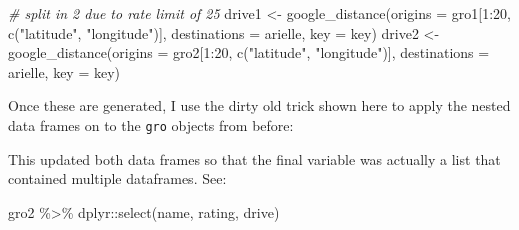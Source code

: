 \documentclass[]{tufte-handout}
\newenvironment{Shaded}{}{}
\newcommand{\AttributeTok}[1]{\textcolor[rgb]{0.49,0.56,0.16}{#1}}
\newcommand{\CommentTok}[1]{\textcolor[rgb]{0.38,0.63,0.69}{\textit{#1}}}
\newcommand{\DecValTok}[1]{\textcolor[rgb]{0.25,0.63,0.44}{#1}}
\newcommand{\FunctionTok}[1]{\textcolor[rgb]{0.02,0.16,0.49}{#1}}
\newcommand{\NormalTok}[1]{#1}
\newcommand{\OtherTok}[1]{\textcolor[rgb]{0.00,0.44,0.13}{#1}}
\newcommand{\SpecialCharTok}[1]{\textcolor[rgb]{0.25,0.44,0.63}{#1}}
\newcommand{\StringTok}[1]{\textcolor[rgb]{0.25,0.44,0.63}{#1}}
\begin{document}
\begin{Shaded}
\begin{Highlighting}[]
\CommentTok{\# split in 2 due to rate limit of 25}
\NormalTok{drive1 }\OtherTok{\textless{}{-}} \FunctionTok{google\_distance}\NormalTok{(}\AttributeTok{origins =}\NormalTok{ gro1[}\DecValTok{1}\SpecialCharTok{:}\DecValTok{20}\NormalTok{, }\FunctionTok{c}\NormalTok{(}\StringTok{"latitude"}\NormalTok{, }\StringTok{"longitude"}\NormalTok{)],}
                      \AttributeTok{destinations =}\NormalTok{ arielle,}
                      \AttributeTok{key =}\NormalTok{ key)}
\NormalTok{drive2 }\OtherTok{\textless{}{-}} \FunctionTok{google\_distance}\NormalTok{(}\AttributeTok{origins =}\NormalTok{ gro2[}\DecValTok{1}\SpecialCharTok{:}\DecValTok{20}\NormalTok{, }\FunctionTok{c}\NormalTok{(}\StringTok{"latitude"}\NormalTok{, }\StringTok{"longitude"}\NormalTok{)],}
                          \AttributeTok{destinations =}\NormalTok{ arielle,}
                          \AttributeTok{key =}\NormalTok{ key)}
\end{Highlighting}
\end{Shaded}

Once these are generated, I use the dirty old trick shown here to apply
the nested data frames on to the \texttt{gro} objects from before:

\begin{Shaded}
\end{Shaded}

This updated both data frames so that the final variable was actually a
list that contained multiple dataframes. See:

\begin{Shaded}
\begin{Highlighting}[]
\NormalTok{gro2 }\SpecialCharTok{\%\textgreater{}\%} 
\NormalTok{  dplyr}\SpecialCharTok{::}\FunctionTok{select}\NormalTok{(name, rating, drive)}
\end{Highlighting}
\end{Shaded}
\end{document}
